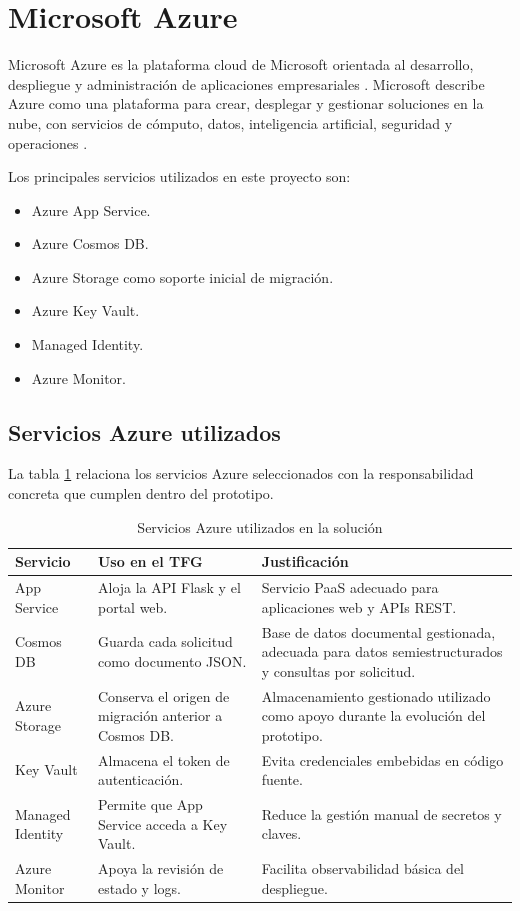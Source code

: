 \section{Microsoft Azure}

Microsoft Azure es la plataforma cloud de Microsoft orientada al desarrollo, despliegue y administración de aplicaciones empresariales \cite{azure_architectures}. Microsoft describe Azure como una plataforma para crear, desplegar y gestionar soluciones en la nube, con servicios de cómputo, datos, inteligencia artificial, seguridad y operaciones \cite{azure_what_is}.

Los principales servicios utilizados en este proyecto son:

\begin{itemize}
    \item Azure App Service.
    \item Azure Cosmos DB.
    \item Azure Storage como soporte inicial de migración.
    \item Azure Key Vault.
    \item Managed Identity.
    \item Azure Monitor.
\end{itemize}

\subsection{Servicios Azure utilizados}

La tabla \ref{tabla:servicios_azure_tfg} relaciona los servicios Azure seleccionados con la responsabilidad concreta que cumplen dentro del prototipo.

\begin{table}[h]
\centering
\small
\begin{tabularx}{\textwidth}{l X X}
\textbf{Servicio} & \textbf{Uso en el TFG} & \textbf{Justificación} \\
\hline
App Service & Aloja la API Flask y el portal web. & Servicio PaaS adecuado para aplicaciones web y APIs REST. \\
Cosmos DB & Guarda cada solicitud como documento JSON. & Base de datos documental gestionada, adecuada para datos semiestructurados y consultas por solicitud. \\
Azure Storage & Conserva el origen de migración anterior a Cosmos DB. & Almacenamiento gestionado utilizado como apoyo durante la evolución del prototipo. \\
Key Vault & Almacena el token de autenticación. & Evita credenciales embebidas en código fuente. \\
Managed Identity & Permite que App Service acceda a Key Vault. & Reduce la gestión manual de secretos y claves. \\
Azure Monitor & Apoya la revisión de estado y logs. & Facilita observabilidad básica del despliegue. \\
\end{tabularx}
\caption{Servicios Azure utilizados en la solución}
\label{tabla:servicios_azure_tfg}
\end{table}

